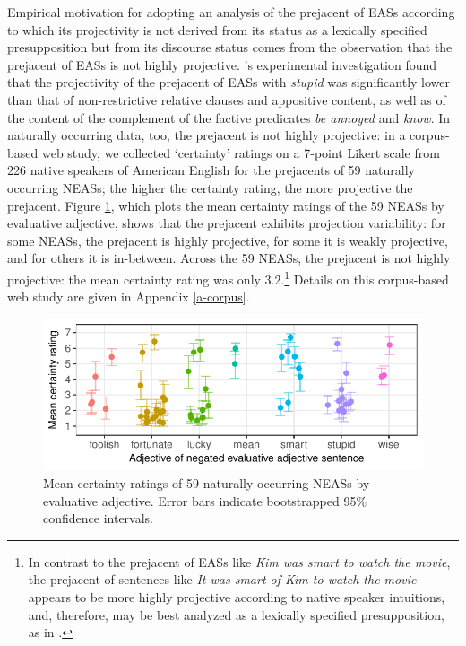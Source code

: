 \documentclass[11pt,fleqn]{article}
\newcommand{\6}{\mbox{$[\hspace*{-.6mm}[$}}
\newcommand{\9}{\mbox{$]\hspace*{-.6mm}]$}}
\newcommand{\citepos}[1]{\citeauthor{#1}'s \citeyear{#1}}
\begin{document}
Empirical motivation for adopting an analysis of the prejacent of EASs according to which its projectivity is not derived from its status as a lexically specified presupposition but from its discourse status comes from the observation that the prejacent of EASs is not highly projective.  \citepos{tbd-variability} experimental investigation found that the projectivity of the prejacent of EASs with {\em stupid} was significantly lower than that of non-restrictive relative clauses and appositive content, as well as of the content of the complement of the factive predicates {\em be annoyed} and {\em know}. In naturally occurring data, too, the prejacent is not highly projective: in a corpus-based web study, we collected `certainty' ratings on a 7-point Likert scale from 226 native speakers of American English for the prejacents of 59 naturally occurring NEASs; the higher the certainty rating, the more projective the prejacent. Figure \ref{f-corpus}, which plots the mean certainty ratings of the 59 NEASs by evaluative adjective, shows that the prejacent exhibits projection variability: for some NEASs, the prejacent is highly projective, for some it is weakly projective, and for others it is in-between. Across the 59 NEASs, the prejacent is not highly projective:  the mean certainty rating was only 3.2.\footnote{In contrast to the prejacent of EASs like {\em Kim was smart to watch the movie}, the prejacent of sentences like {\em It was smart of Kim to watch the movie} appears to be more highly projective according to native speaker intuitions, and, therefore, may be best analyzed as a lexically specified presupposition, as in \citealt{oshima09b}.} Details on this corpus-based web study are given in Appendix \ref{a-corpus}.

\begin{figure}[h!]
\centering

\includegraphics[width=.6\paperwidth]{../exp1-corpus-study/graphs/mean-response-by-item-and-adj}

\caption{Mean certainty ratings of 59 naturally occurring NEASs by evaluative adjective. Error bars indicate bootstrapped 95\% confidence intervals.}\label{f-corpus}

\end{figure}
\end{document}
